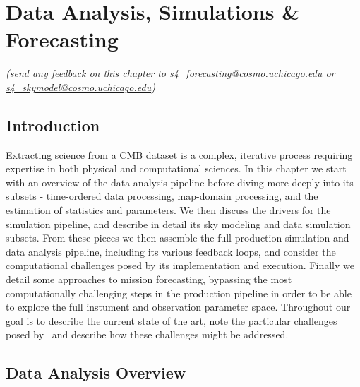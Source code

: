  
\chapter{Data Analysis, Simulations \& Forecasting}


\begin{center}
{\it \small (send any feedback on this chapter to 
\href{mailto:s4_forecasting@cosmo.uchicago.edu}{s4\_forecasting@cosmo.uchicago.edu}
or
\href{mailto:s4_skymodel@cosmo.uchicago.edu}{s4\_skymodel@cosmo.uchicago.edu})}
\end{center}

\section{Introduction}

Extracting science from a CMB dataset is a complex, iterative process requiring expertise in both physical and computational sciences. In this chapter we start with an overview of the data analysis pipeline before diving more deeply into its subsets - time-ordered data processing, map-domain processing, and the estimation of statistics and parameters. We then discuss the drivers for the simulation pipeline, and describe in detail its sky modeling and data simulation subsets. From these pieces we then assemble the full production simulation and data analysis pipeline, including its various feedback loops, and consider the computational challenges posed by its implementation and execution. Finally we detail some approaches to mission forecasting, bypassing the most computationally challenging steps in the production pipeline in order to be able to explore the full instument and observation parameter space. Throughout our goal is to describe the current state of the art, note the particular challenges posed by \cmbexp\, and describe how these challenges might be addressed.

\section{Data Analysis Overview}

